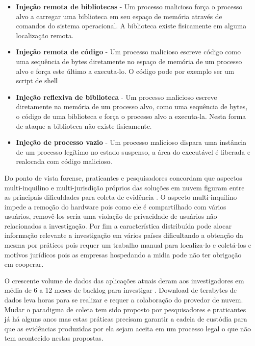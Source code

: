 \documentclass[
	12pt,				%
	openright,			%
	oneside,			%
	a4paper,			%
	english,			%
	brazil,				%
	]{abntex2}
\begin{document}
\begin{itemize}
 \item \textbf{Injeção remota de bibliotecas} - Um processo malicioso força o processo alvo a carregar uma biblioteca em seu espaço de memória através de comandos do sistema operacional.
 A biblioteca existe fisicamente em alguma localização remota.
 \item \textbf{Injeção remota de código} - Um processo malicioso escreve código como uma sequência de bytes diretamente no espaço de memória de um processo alvo e força este 
 último a executa-lo. O código pode por exemplo ser um script de shell
 \item \textbf{Injeção reflexiva de biblioteca} - Um processo malicioso escreve diretamente na memória de um processo alvo, como uma sequência de bytes, o código de uma biblioteca
 e força o processo alvo a executa-la. Nesta forma de ataque a biblioteca não existe fisicamente.
 \item \textbf{Injeção de processo vazio} - Um processo malicioso dispara uma instância de um processo legítimo no estado suspenso, a área do executável é liberada e realocada com 
 código malicioso.
\end{itemize}

Do ponto de vista forense, praticantes e pesquisadores concordam que aspectos multi-inquilino e multi-jurisdição próprios das soluções em nuvem figuram entre as principais 
dificuldades para coleta de evidência \cite{Bash2015a}. O aspecto multi-inquilino impede a remoção do hardware pois como ele é compartilhado com vários usuários, 
removê-los seria uma violação de privacidade de usuários não relacionados a investigação. Por fim a característica distribuída pode alocar informação relevante a 
investigação em vários países dificultando a obtenção da mesma \cite{Dykstra2012a} por práticos pois requer um trabalho manual para localiza-lo e coletá-los e motívos
jurídicos pois as empresas hospedando a midia pode não ter obrigação em cooperar.

O crescente volume de dados das aplicações atuais deram aos investigadores em média de 6 a 12 meses de backlog para investigar \cite{Quick2014}. Download de terabytes
de dados leva horas para se realizar e requer a colaboração do provedor de nuvem. Mudar o paradigma de coleta tem sido proposto por pesquisadores e praticantes já há alguns
anos \cite{Birk2011}\cite{Sang2013} mas estas práticas precisam garantir a cadeia de custódia para que as evidências produzidas por ela sejam aceita em um processo legal
o que não tem acontecido nestas propostas.\\
\end{document}
